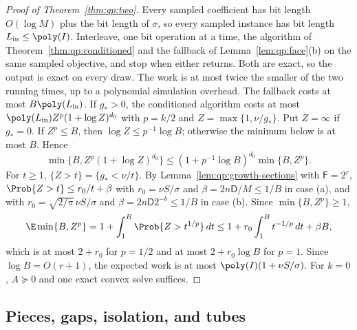 \begin{proof}[Proof of Theorem~\ref{thm:qp:two}]
Every sampled coefficient has bit length $O(\log M)$ plus the bit length of
$\sigma$, so every sampled instance has bit length $L_{\rm in}\le\poly(I)$.
Interleave, one bit operation at a time, the algorithm of
Theorem~\ref{thm:qp:conditioned} and the fallback of Lemma~\ref{lem:qp:face}(b)
on the same sampled objective, and stop when either returns. Both are exact,
so the output is exact on every draw. The work is at most twice the smaller
of the two running times, up to a polynomial simulation overhead. The
fallback costs at most $B\poly(L_{\rm in})$. If $g_*>0$, the conditioned
algorithm costs at most $\poly(L_{\rm in})Z^p(1+\log Z)^{d_0}$ with $p=k/2$ and
$Z=\max\{1,\nu/g_*\}$. Put $Z=\infty$ if $g_*=0$. If $Z^p\le B$, then
$\log Z\le p^{-1}\log B$; otherwise the minimum below is at most $B$. Hence
\[
 \min\{B,Z^p(1+\log Z)^{d_0}\}\le(1+p^{-1}\log B)^{d_0}\min\{B,Z^p\}.
\]
For $t\ge1$, $\{Z>t\}=\{g_*<\nu/t\}$. By Lemma~\ref{lem:qp:growth-sections}
with $\mathsf F=2^r$, $\Prob\{Z>t\}\le r_0/t+\beta$ with $r_0=\nu S/\sigma$ and
$\beta=2n\mathsf D/M\le1/B$ in case (a), and with $r_0=\sqrt{2/\pi}\,\nu S/\sigma$
and $\beta=2n\mathsf D2^{-b}\le1/B$ in case (b). Since $\min\{B,Z^p\}\ge1$,
\[
 \E\min\{B,Z^p\}=1+\int_1^B\Prob\{Z>t^{1/p}\}\,dt
 \le1+r_0\int_1^Bt^{-1/p}\,dt+\beta B,
\]
which is at most $2+r_0$ for $p=1/2$ and at most $2+r_0\log B$ for $p=1$.
Since $\log B=O(r+1)$, the expected work is at most
$\poly(I)(1+\nu S/\sigma)$. For $k=0$, $A\succeq0$ and one exact convex solve
suffices.
\end{proof}

\subsection{Pieces, gaps, isolation, and tubes}

